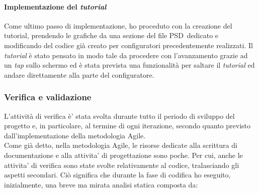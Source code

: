 \paragraph{Implementazione del \textit{tutorial}}
Come ultimo passo di implementazione, ho proceduto con la creazione del tutorial, prendendo le grafiche da una sezione del file PSD\gloss\ dedicato e modificando del codice gi\`a creato per configuratori precedentemente realizzati. Il \textit{tutorial} \`e stato pensato in modo tale da procedere con l'avanzamento grazie ad un \textit{tap} sullo schermo ed \`e stata prevista una funzionalit\`a per saltare il \textit{tutorial} ed andare direttamente alla parte del configuratore.

\subsubsection{Verifica e validazione}
L'attivit\`a di verifica \`e' stata svolta durante tutto il periodo di sviluppo del progetto e, in particolare, al termine di ogni iterazione, secondo quanto previsto dall'implementazione della metodologia Agile.\\ 
Come gi\`a detto, nella metodologia Agile, le risorse dedicate alla scrittura di documentazione e alla attivita' di progettazione sono poche. Per cui, anche le attivita' di verifica sono state svolte relativamente al codice, tralasciando gli aspetti secondari.
Ci\`o significa che durante la fase di codifica ho eseguito, inizialmente, una breve ma mirata analisi statica composta da:

